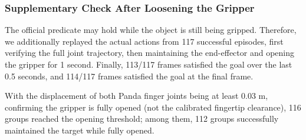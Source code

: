 
\subsubsection{Supplementary Check After Loosening the Gripper}\label{s08-detail-5}

The official predicate may hold while the object is still being gripped. Therefore, we additionally replayed the actual actions from 117 successful episodes, first verifying the full joint trajectory, then maintaining the end-effector and opening the gripper for 1 second. Finally, 113/117 frames satisfied the goal over the last 0.5 seconds, and 114/117 frames satisfied the goal at the final frame.

With the displacement of both Panda finger joints being at least 0.03 m, confirming the gripper is fully opened (not the calibrated fingertip clearance), 116 groups reached the opening threshold; among them, 112 groups successfully maintained the target while fully opened.

